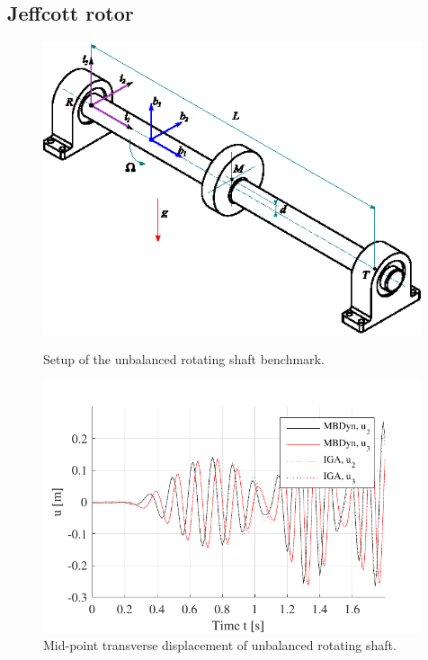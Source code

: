 \documentclass[review]{elsarticle}
\begin{document}
%

\subsection{Jeffcott rotor}

\begin{figure}%
 \begin{minipage}[b]{0.4\linewidth}
    \centering
    \includegraphics[width=0.99\textwidth]{benchmark_jeffcott/setup_jeffcott.eps}
    \caption{Setup of the unbalanced rotating shaft benchmark.}
    \label{figJRsetup}
 \end{minipage}
 \hspace{0.4cm}
 \begin{minipage}[b]{0.55\linewidth}
    \centering
    \includegraphics[width=0.99\textwidth]{benchmark_jeffcott/benchmark_jeffcott.pdf}
    \caption{Mid-point transverse displacement of unbalanced rotating shaft.}
    \label{figJRdisp}
 \end{minipage}
\end{figure}
\end{document}
